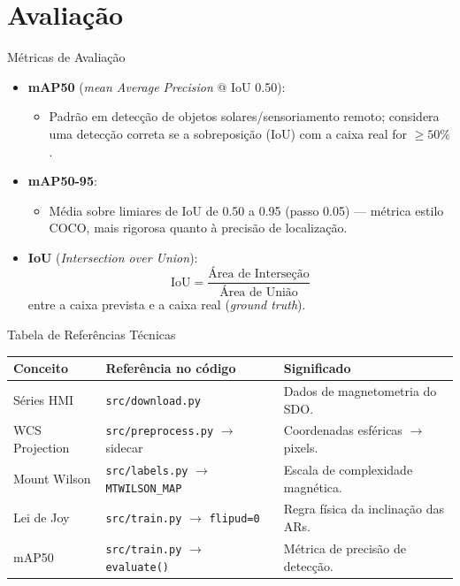 \documentclass[aspectratio=169]{beamer}
\begin{document}
\section{Avaliação}

\begin{frame}{Métricas de Avaliação}
  \begin{itemize}
    \item \textbf{mAP50} (\emph{mean Average Precision} @ IoU 0.50):
    \begin{itemize}
      \small \item Padrão em detecção de objetos solares/sensoriamento remoto; considera uma detecção correta se a sobreposição (IoU) com a caixa real for $\geq 50\%$.
    \end{itemize}
    \item \textbf{mAP50-95}:
    \begin{itemize}
      \small \item Média sobre limiares de IoU de 0.50 a 0.95 (passo 0.05) — métrica estilo COCO, mais rigorosa quanto à precisão de localização.
    \end{itemize}
    \item \textbf{IoU} (\emph{Intersection over Union}):
    $$\text{IoU} = \frac{\text{Área de Interseção}}{\text{Área de União}}$$
    entre a caixa prevista e a caixa real (\emph{ground truth}).
  \end{itemize}
\end{frame}

\begin{frame}{Tabela de Referências Técnicas}
  \begin{table}
    \small
    \begin{tabular}{p{2.6cm} p{3.4cm} p{5cm}}
      \toprule
      \textbf{Conceito} & \textbf{Referência no código} & \textbf{Significado} \\
      \midrule
      Séries HMI & \texttt{src/download.py} & Dados de magnetometria do SDO. \\
      WCS Projection & \texttt{src/preprocess.py} $\to$ sidecar & Coordenadas esféricas $\to$ pixels. \\
      Mount Wilson & \texttt{src/labels.py} $\to$ \texttt{MTWILSON\_MAP} & Escala de complexidade magnética. \\
      Lei de Joy & \texttt{src/train.py} $\to$ \texttt{flipud=0} & Regra física da inclinação das ARs. \\
      mAP50 & \texttt{src/train.py} $\to$ \texttt{evaluate()} & Métrica de precisão de detecção. \\
      \bottomrule
    \end{tabular}
  \end{table}
\end{frame}
\end{document}
